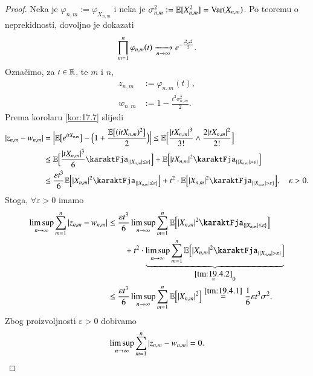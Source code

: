 \begin{proof}
    Neka je $\varphi_{n, m} := \varphi_{X_{n, m}}$ i neka je $\sigma^2_{n, m} := \mathbb{E} [X_{n, m}^2] = \mathrm{Var} (X_{n, m})$.
    Po teoremu o neprekidnosti, dovoljno je dokazati
    \begin{equation*}
        \prod\limits_{m = 1}^{n} \varphi_{n, m} (t) \xrightarrow[n \to \infty]{} e^{-\frac{t^2 \sigma^2}{2}}.
    \end{equation*}
    Ozna\v cimo, za $t \in \mathbb{R}$, te $m$ i $n$,
    \begin{equation*}
        \begin{aligned}
            z_{n, m} &:= \varphi_{n, m} (t),\\
            w_{n, m} &:= 1 - \frac{t^2 \sigma_{n, m}^2}{2}.
        \end{aligned}
    \end{equation*}
    Prema korolaru \ref{kor:17.7} slijedi
    \begin{equation*}
        \begin{aligned}
            |z_{n, m} - w_{n, m}| &= \Big| \masE \big[ e^{i t X_{n, m}} \big] - \Big( 1 + \frac{\masE \big[ (i t X_{n, m})^2 \big]}{2} \Big) \Big| \leq \masE \Big[ \frac{|t X_{n, m}|^3}{3!} \land \frac{2 |t X_{n, m}|^2}{2!} \Big]\\
            &\leq \masE \Big[ \frac{|t X_{n, m}|^3}{6} \karaktFja_{\{ |X_{n, m}| \leq \varepsilon \}} \Big] + \masE \Big[ |t X_{n, m}|^2 \karaktFja_{\{ |X_{n, m}| > \varepsilon \}} \Big]\\
            &\leq \frac{\varepsilon t^3}{6} \masE \Big[ |X_{n, m}|^2 \karaktFja_{\{ |X_{n, m}| \leq \varepsilon  \}} \Big] + t^2 \cdot \masE \Big[ |X_{n, m}|^2 \karaktFja_{\{ |X_{n, m}| > \varepsilon \}} \Big], \quad \varepsilon > 0.
        \end{aligned}
    \end{equation*}
    Stoga, $\forall \varepsilon > 0$ imamo
    \begin{equation*}
        \begin{aligned}
            \limsup\limits_{n \to \infty} \suma{m = 1}{n} |z_{n, m} - w_{n, m}| &\leq \frac{\varepsilon t^3}{6} \limsup\limits_{n \to \infty} \suma{m = 1}{n} \masE \Big[ |X_{n, m}|^2 \karaktFja_{\{ |X_{n, m}| \leq \varepsilon \}} \Big]\\
            &\quad \quad + t^2 \cdot \underbrace{\limsup\limits_{n \to \infty} \suma{m = 1}{n} \masE \Big[ |X_{n, m}|^2 \karaktFja_{\{|X_{n, m}| > \varepsilon \}} \Big]  }_{\overset{\ref{tm:19.4.2}}{=} 0}\\
            &\leq \frac{\varepsilon t^3}{6} \limsup\limits_{n \to \infty} \suma{m = 1}{n} \masE \Big[ |X_{n, m}|^2 \Big] \overset{\ref{tm:19.4.1}}{=} \frac{1}{6} \varepsilon t^3 \sigma^2.
        \end{aligned}
    \end{equation*}
    Zbog proizvoljnosti $\varepsilon > 0$ dobivamo
    \begin{equation}    \label{jed:19.5}
        \limsup\limits_{n \to \infty} \sum\limits_{m = 1}^{n} |z_{n, m} - w_{n, m}| = 0.
    \end{equation}


\end{proof}
